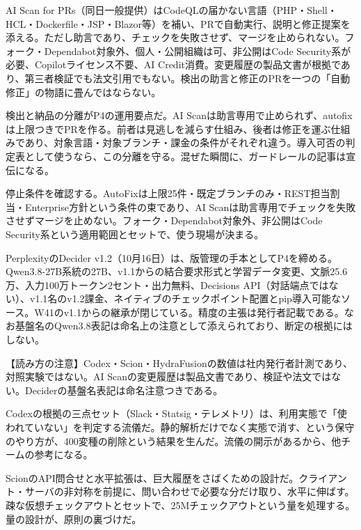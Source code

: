 \documentclass[lualatex,a4paper,10pt]{jlreq}
\begin{document}
AI Scan for PRs（同日一般提供）はCodeQLの届かない言語（PHP・Shell・HCL・Dockerfile・JSP・Blazor等）を補い、PRで自動実行、説明と修正提案を添える。ただし助言であり、チェックを失敗させず、マージを止められない。フォーク・Dependabot対象外、個人・公開組織は可、非公開はCode Security系が必要、Copilotライセンス不要、AI Credit消費。変更履歴の製品文書が根拠であり、第三者検証でも法文引用でもない。検出の助言と修正のPRを一つの「自動修正」の物語に畳んではならない。
\cite{B35,B78}


検出と納品の分離がP4の運用要点だ。AI Scanは助言専用で止められず、autofixは上限つきでPRを作る。前者は見逃しを減らす仕組み、後者は修正を運ぶ仕組みであり、対象言語・対象ブランチ・課金の条件がそれぞれ違う。導入可否の判定表として使うなら、この分離を守る。混ぜた瞬間に、ガードレールの記事は宣伝になる。
\cite{B34,B77,B35,B78}


停止条件を確認する。AutoFixは上限25件・既定ブランチのみ・REST担当割当・Enterprise方針という条件の束であり、AI Scanは助言専用でチェックを失敗させずマージを止めない。フォーク・Dependabot対象外、非公開はCode Security系という適用範囲とセットで、使う現場が決まる。
\cite{B34,B77,B35,B78}


PerplexityのDecider v1.2（10月16日）は、版管理の手本としてP4を締める。Qwen3.8-27B系統の27B、v1.1からの結合要求形式と学習データ変更、文脈25.6万、入力100万トークン2セント・出力無料、Decisions API（対話端点ではない）、v1.1名のv1.2課金、ネイティブのチェックポイント配置とpip導入可能なソース。W41のv1.1からの継承が閉じている。精度の主張は発行者記載である。なお基盤名のQwen3.8表記は命名上の注意として添えられており、断定の根拠にはしない。
\cite{B37,B36,B38}


\begin{tcolorbox}[colback=SurveySoft,colframe=SurveyRule,arc=1mm,boxrule=0.4pt,left=2mm,right=2mm]
【読み方の注意】Codex・Scion・HydraFusionの数値は社内発行者計測であり、対照実験ではない。AI Scanの変更履歴は製品文書であり、検証や法文ではない。Deciderの基盤名表記は命名注意つきである。
\end{tcolorbox}
\cite{B31,B32,B75,B33,B76,B34,B77,B35}


Codexの根拠の三点セット（Slack・Statsig・テレメトリ）は、利用実態で「使われていない」を判定する流儀だ。静的解析だけでなく実態で消す、という保守のやり方が、400変種の削除という結果を生んだ。流儀の開示があるから、他チームの参考になる。
\cite{B31}


ScionのAPI問合せと水平拡張は、巨大履歴をさばくための設計だ。クライアント・サーバの非対称を前提に、問い合わせで必要な分だけ取り、水平に伸ばす。疎な仮想チェックアウトとセットで、25Mチェックアウトという量を処理する。量の設計が、原則の裏づけだ。
\cite{B32,B75}
\end{document}
